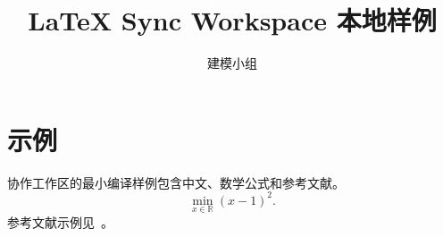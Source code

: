 \documentclass[UTF8,fontset=fandol]{ctexart}
\title{LaTeX Sync Workspace 本地样例}
\author{建模小组}
\date{}
\begin{document}
\maketitle
\section{示例}
协作工作区的最小编译样例包含中文、数学公式和参考文献。
\[
  \min_{x \in \mathbb{R}} (x-1)^2.
\]
参考文献示例见~\cite{knuth84}。


\end{document}
